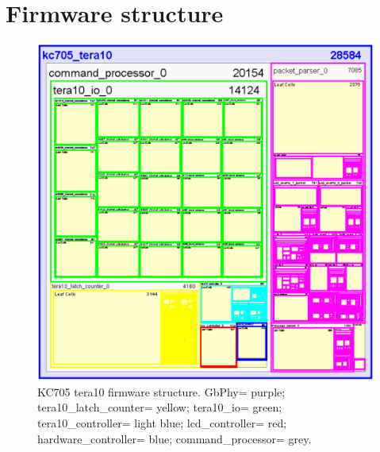 \section{Firmware structure}
\noindent
\begin{figure}[H]
	\centering
	\includegraphics[width=0.45\linewidth]{IMG/ch4/HIERARCHY5}
	\caption{KC705 tera10 firmware structure. GbPhy= purple; tera10\_latch\_counter= yellow; tera10\_io= green; tera10\_controller= light blue; lcd\_controller= red; hardware\_controller= blue; command\_processor= grey.}
	\label{fig:tera10}
\end{figure}
